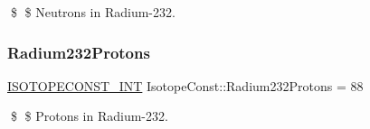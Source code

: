 \$ \$ Neutrons in Radium-\/232. \mbox{\label{group___isotope_const-_radium-_ra232_gacbed461304c988913203a53968f1e256}} 
\subsubsection{\texorpdfstring{Radium232\+Protons}{Radium232Protons}}
{\footnotesize\ttfamily \mbox{\hyperlink{group___isotope_const-_macros_ga5f18360b3e99483a35c32d789e62621c}{I\+S\+O\+T\+O\+P\+E\+C\+O\+N\+S\+T\+\_\+\+I\+NT}} Isotope\+Const\+::\+Radium232\+Protons = 88}

\$ \$ Protons in Radium-\/232. 